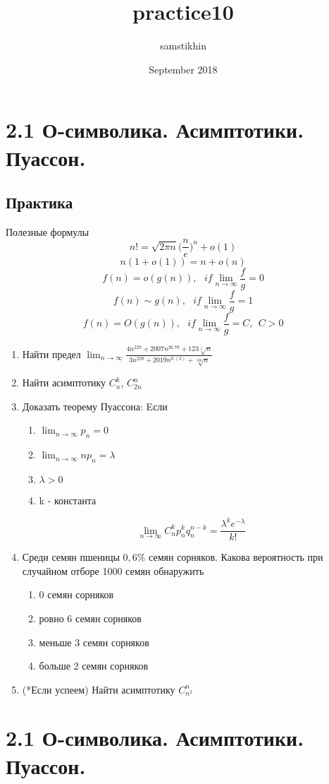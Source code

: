 \documentclass[a4paper, 14pt]{extarticle}
\title{practice10}
\author{samstikhin}
\date{September 2018}
\begin{document}
\section*{2.1 О-символика. Асимптотики. Пуассон.}
\subsection*{Практика}
Полезные формулы
$$n! = \sqrt{2\pi n}\Big(\frac{n}{e}\Big)^n + o(1)$$
$$n(1+o(1)) = n + o(n)$$
$$f(n) = o(g(n)), ~~~if \lim_{n \to \infty} \frac{f}{g} = 0$$
$$f(n) \sim g(n), ~~~if \lim_{n \to \infty} \frac{f}{g} = 1$$
$$f(n) = O(g(n)), ~~~if \lim_{n \to \infty} \frac{f}{g} = C, ~~C > 0$$
\begin{enumerate}
\item Найти предел $\lim_{n\to \infty}\frac{4n^{228} + 2007n^{26.78} + 123\sqrt[5]{n}}{3n^{228} + 2019n^{0.(3)} + \sqrt[500]{n}}$
\item Найти асимптотику $C_n^k$, $C_{2n}^n$ 
\item Доказать теорему Пуассона: 
Eсли\begin{enumerate}
    \item $\lim_{n \to \infty}p_n = 0$
    \item $\lim_{n\to \infty}np_n = \lambda$
    \item $\lambda > 0$
    \item k - константа
\end{enumerate}
$$\lim_{n \to \infty}C_n^{k}p_n^k q_n^{n-k} = \frac{\lambda^{k}e^{-\lambda}}{k!}$$
\item Среди семян пшеницы $0,6\%$ семян сорняков. Какова вероятность при случайном отборе 1000 семян обнаружить 
\begin{enumerate}
    \item 0 семян сорняков
    \item ровно 6 семян сорняков
    \item меньше 3 семян сорняков
    \item больше 2 семян сорняков
\end{enumerate}
\item (*Если успеем) Найти асимптотику $C_{n^2}^{n}$


\end{enumerate}
\newpage

\section*{2.1 О-символика. Асимптотики. Пуассон.}
\end{document}
